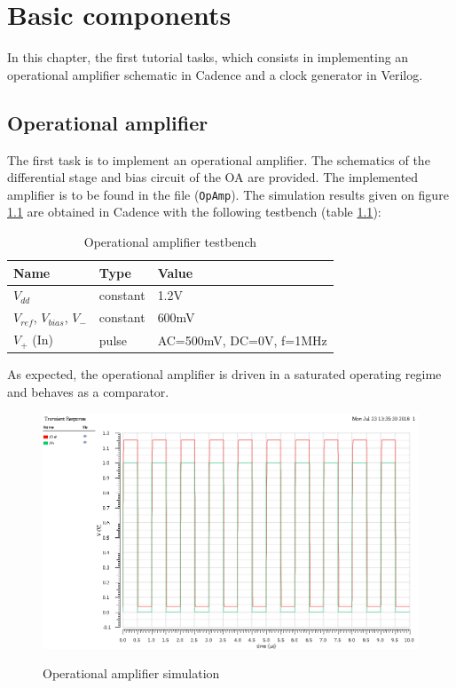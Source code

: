 \chapter{Basic components}

In this chapter, the first tutorial tasks, which consists in implementing an operational amplifier schematic in Cadence and a clock generator in Verilog. 

\section{Operational amplifier}

The first task is to implement an operational amplifier. The schematics of the differential stage and bias circuit of the OA are provided. The implemented amplifier is to be found in the file (\texttt{OpAmp}). The simulation results given on figure \ref{fig:opAmpSimulation} are obtained in Cadence with the following testbench (table \ref{table:opAmpTestbench}): 

\begin{table}[!h]
	\centering
	\begin{tabular}{|l|l|l|}
		\hline
		Name & Type & Value \\
		\hline
		$V_{dd}$ & constant & 1.2V \\
		$V_{ref}$, $V_{bias}$, $V_{-}$ & constant & 600mV \\
		$V_{+}$ (In) & pulse & AC=500mV, DC=0V, f=1MHz \\
		\hline
	\end{tabular}
	\label{table:opAmpTestbench}
	\caption{Operational amplifier testbench}
\end{table}

As expected, the operational amplifier is driven in a saturated operating regime and behaves as a comparator.

\begin{figure}[h]
	\centering
	\includegraphics[scale=0.65]{images/BasicComponents/Task1OpAmpSimulation.png}
	\label{fig:opAmpSimulation}
	\caption{Operational amplifier simulation}
\end{figure} 

